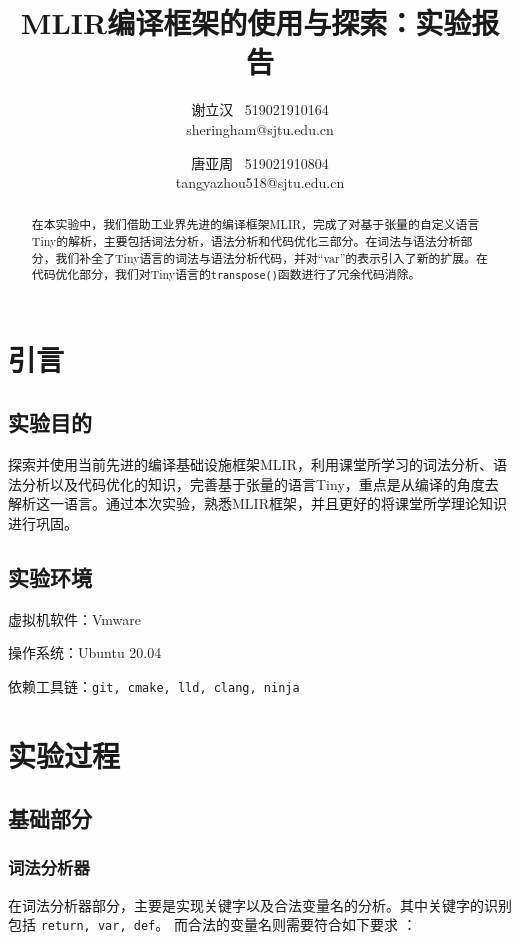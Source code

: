 \documentclass[lang=cn,11pt,a4paper]{elegantpaper}
\title{MLIR编译框架的使用与探索：实验报告}
\author{谢立汉 \ 519021910164 \\ sheringham@sjtu.edu.cn \and 唐亚周 \ 519021910804 \\ tangyazhou518@sjtu.edu.cn}
\institute{SJTU\ CS2301\ 编译原理（A类）}
\date{\zhtoday}
\begin{document}
\maketitle

\begin{abstract}
在本实验中，我们借助工业界先进的编译框架MLIR，完成了对基于张量的自定义语言Tiny的解析，主要包括词法分析，语法分析和代码优化三部分。在词法与语法分析部分，我们补全了Tiny语言的词法与语法分析代码，并对“var”的表示引入了新的扩展。在代码优化部分，我们对Tiny语言的\texttt{transpose()}函数进行了冗余代码消除。
\end{abstract}


\section{引言}

\subsection{实验目的}
探索并使用当前先进的编译基础设施框架MLIR，利用课堂所学习的词法分析、语法分析以及代码优化的知识，完善基于张量的语言Tiny，重点是从编译的角度去解析这一语言。通过本次实验，熟悉MLIR框架，并且更好的将课堂所学理论知识进行巩固。
\subsection{实验环境}

虚拟机软件：Vmware

操作系统：Ubuntu 20.04

依赖工具链：\texttt{git, cmake, lld, clang, ninja}

\section{实验过程}

\subsection{基础部分}

\subsubsection{词法分析器}

在词法分析器部分，主要是实现关键字以及合法变量名的分析。其中关键字的识别包括 \texttt{return, var, def}。 而合法的变量名则需要符合如下要求 ：
\end{document}
